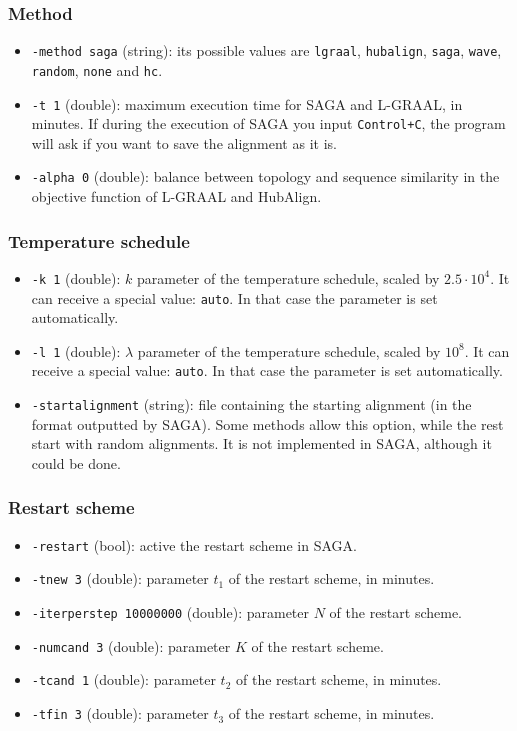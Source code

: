 \documentclass[]{article}
\begin{document}
\subsubsection*{Method}
\begin{itemize}
\item\texttt{-method saga} (string): its possible values are \texttt{lgraal}, \texttt{hubalign}, \texttt{saga}, \texttt{wave}, \texttt{random}, \texttt{none} and \texttt{hc}.
\item\texttt{-t 1} (double): maximum execution time for SAGA and L-GRAAL, in minutes. If during the execution of SAGA you input \texttt{Control+C}, the program will ask if you want to save the alignment as it is. 
\item\texttt{-alpha 0} (double): balance between topology and sequence similarity in the objective function of L-GRAAL and HubAlign.
\end{itemize}
\subsubsection*{Temperature schedule}
\begin{itemize}
\item\texttt{-k 1} (double): $k$ parameter of the temperature schedule, scaled by $2.5\cdot 10^{4}$. It can receive a special value: \texttt{auto}. In that case the parameter is set automatically.
\item\texttt{-l 1} (double): $\lambda$ parameter of the temperature schedule, scaled by $10^8$. It can receive a special value: \texttt{auto}. In that case the parameter is set automatically.
\item\texttt{-startalignment} (string): file containing the starting alignment (in the format outputted by SAGA). Some methods allow this option, while the rest start with random alignments. It is not implemented in SAGA, although it could be done.
\end{itemize}
\subsubsection*{Restart scheme}
\begin{itemize}
\item\texttt{-restart} (bool): active the restart scheme in SAGA.
\item\texttt{-tnew 3} (double): parameter $t_1$ of the restart scheme, in minutes.
\item\texttt{-iterperstep 10000000} (double): parameter $N$ of the restart scheme.
\item\texttt{-numcand 3} (double): parameter $K$ of the restart scheme.
\item\texttt{-tcand 1} (double): parameter $t_2$ of the restart scheme, in minutes.
\item\texttt{-tfin 3} (double): parameter $t_3$ of the restart scheme, in minutes.
\end{itemize}
\end{document}
